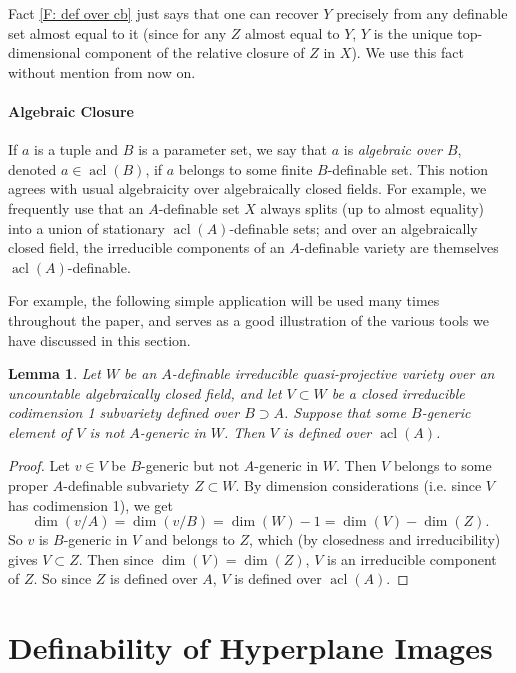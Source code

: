 \documentclass{amsart}
\newtheorem{lemma}[theorem]{Lemma}
\theoremstyle{definition}
\newcommand{\acl}{\operatorname{acl}}
\begin{document}
Fact \ref{F: def over cb} just says that one can recover $Y$ precisely from any definable set almost equal to it (since for any $Z$ almost equal to $Y$, $Y$ is the unique top-dimensional component of the relative closure of $Z$ in $X$). We use this fact without mention from now on.

\subsection{Algebraic Closure}

If $a$ is a tuple and $B$ is a parameter set, we say that $a$ is \textit{algebraic over $B$}, denoted $a\in\acl(B)$, if $a$ belongs to some finite $B$-definable set. This notion agrees with usual algebraicity over algebraically closed fields. For example, we frequently use that an $A$-definable set $X$ always splits (up to almost equality) into a union of stationary $\acl(A)$-definable sets; and over an algebraically closed field, the irreducible components of an $A$-definable variety are themselves $\acl(A)$-definable.

For example, the following simple application will be used many times throughout the paper, and serves as a good illustration of the various tools we have discussed in this section.

\begin{lemma}\label{L: codim 1 definable over acl}
    Let $W$ be an $A$-definable irreducible quasi-projective variety over an uncountable algebraically closed field, and let $V\subset W$ be a closed irreducible codimension 1 subvariety defined over $B\supset A$. Suppose that some $B$-generic element of $V$ is not $A$-generic in $W$. Then $V$ is defined over $\acl(A)$.
\end{lemma}
\begin{proof}
    Let $v\in V$ be $B$-generic but not $A$-generic in $W$. Then $V$ belongs to some proper $A$-definable subvariety $Z\subset W$. By dimension considerations (i.e. since $V$ has codimension 1), we get $$\dim(v/A)=\dim(v/B)=\dim(W)-1=\dim(V)-\dim(Z).$$ So $v$ is $B$-generic in $V$ and belongs to $Z$, which (by closedness and irreducibility) gives $V\subset Z$. Then since $\dim(V)=\dim(Z)$, $V$ is an irreducible component of $Z$. So since $Z$ is defined over $A$, $V$ is defined over $\acl(A)$.
\end{proof}

\part{Definability of Hyperplane Images}
\end{document}
